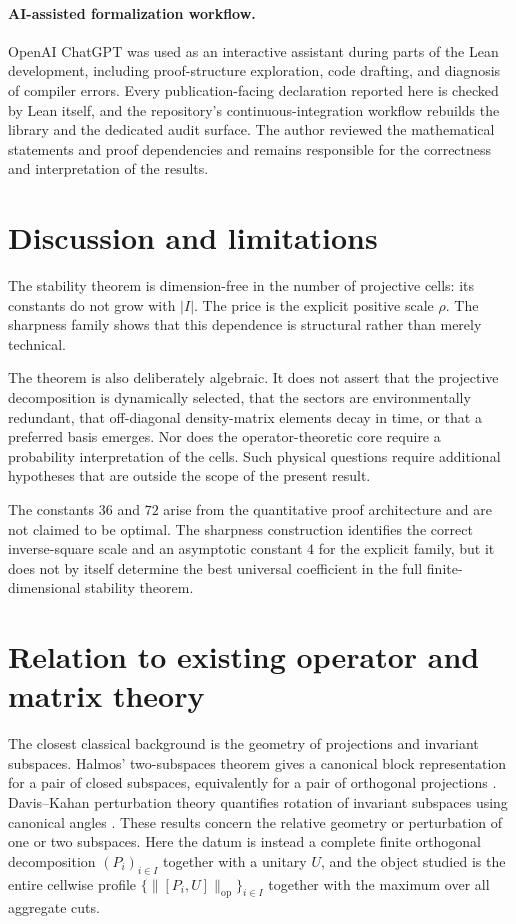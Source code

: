 \documentclass[11pt]{article}
\newcommand{\op}{\mathrm{op}}
\begin{document}
\paragraph{AI-assisted formalization workflow.}
OpenAI ChatGPT was used as an interactive assistant during parts of the Lean
development, including proof-structure exploration, code drafting, and
diagnosis of compiler errors. Every publication-facing declaration reported
here is checked by Lean itself, and the repository's continuous-integration
workflow rebuilds the library and the dedicated audit surface. The author
reviewed the mathematical statements and proof dependencies and remains
responsible for the correctness and interpretation of the results.

\section{Discussion and limitations}

The stability theorem is dimension-free in the number of projective cells:
its constants do not grow with $|I|$.  The price is the explicit positive
scale $\rho$.  The sharpness family shows that this dependence is structural
rather than merely technical.

The theorem is also deliberately algebraic.  It does not assert that the
projective decomposition is dynamically selected, that the sectors are
environmentally redundant, that off-diagonal density-matrix elements decay
in time, or that a preferred basis emerges.  Nor does the operator-theoretic
core require a probability interpretation of the cells.  Such physical
questions require additional hypotheses that are outside the scope of the
present result.

The constants $36$ and $72$ arise from the quantitative proof architecture
and are not claimed to be optimal.  The sharpness construction identifies the
correct inverse-square scale and an asymptotic constant $4$ for the explicit
family, but it does not by itself determine the best universal coefficient in
the full finite-dimensional stability theorem.

\section{Relation to existing operator and matrix theory}
\label{sec:related}

The closest classical background is the geometry of projections and invariant
subspaces.  Halmos' two-subspaces theorem gives a canonical block
representation for a pair of closed subspaces, equivalently for a pair of
orthogonal projections \cite{Halmos1969TwoSubspaces}.  Davis--Kahan
perturbation theory quantifies rotation of invariant subspaces using canonical
angles \cite{DavisKahan1970}.  These results concern the relative geometry or
perturbation of one or two subspaces.  Here the datum is instead a complete
finite orthogonal decomposition $(P_i)_{i\in I}$ together with a unitary $U$,
and the object studied is the entire cellwise profile
$\{\|[P_i,U]\|_{\op}\}_{i\in I}$ together with the maximum over all aggregate
cuts.
\end{document}
